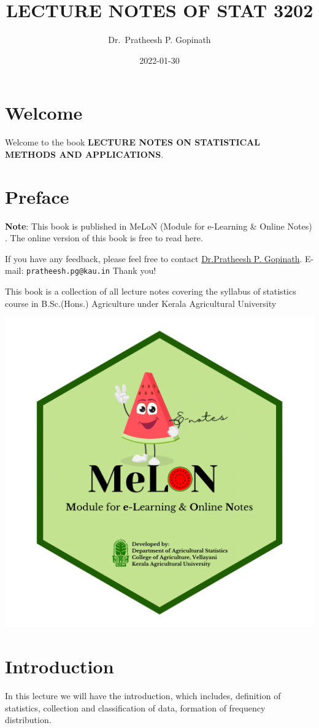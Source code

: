 \documentclass[
]{book}
\title{LECTURE NOTES OF STAT 3202}
\author{Dr.~Pratheesh P. Gopinath}
\date{2022-01-30}
\begin{document}
\maketitle

{
\setcounter{tocdepth}{1}
\tableofcontents
}
\hypertarget{welcome}{%
\chapter*{Welcome}\label{welcome}}

Welcome to the book \textbf{LECTURE NOTES ON STATISTICAL METHODS AND APPLICATIONS}.

\hypertarget{preface}{%
\chapter*{Preface}\label{preface}}

\textbf{Note}: This book is published in MeLoN (Module for e-Learning \& Online Notes) . The online version of this book is free to read here.

If you have any feedback, please feel free to contact \href{https://coavellayani.kau.in/people/dr-pratheesh-p-gopinath}{Dr.Pratheesh P. Gopinath}. E-mail: \texttt{pratheesh.pg@kau.in} Thank you!

This book is a collection of all lecture notes covering the syllabus of statistics course in B.Sc.(Hons.) Agriculture under Kerala Agricultural University

\begin{center}\includegraphics[width=0.3\linewidth]{docs/logo} \end{center}

\hypertarget{introduction}{%
\chapter{Introduction}\label{introduction}}

In this lecture we will have the introduction, which includes, definition of statistics, collection and classification of data, formation of frequency distribution.\citep{goon} \citep{gupta}
\end{document}
